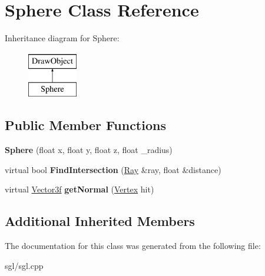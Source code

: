 \hypertarget{class_sphere}{}\section{Sphere Class Reference}
\label{class_sphere}
Inheritance diagram for Sphere\+:\begin{figure}[H]
\begin{center}
\leavevmode
\includegraphics[height=2.000000cm]{class_sphere}
\end{center}
\end{figure}
\subsection*{Public Member Functions}
\begin{DoxyCompactItemize}
\item 
\mbox{\label{class_sphere_a9a4226026f582a564c5d02939bb0f232}} 
{\bfseries Sphere} (float x, float y, float z, float \+\_\+radius)
\item 
\mbox{\label{class_sphere_acbad5180e6fd66b3f95d29cfa1139458}} 
virtual bool {\bfseries Find\+Intersection} (\hyperlink{class_ray}{Ray} \&ray, float \&distance)
\item 
\mbox{\label{class_sphere_a89d2bfb75666f496514bd35c2e23a1ce}} 
virtual \hyperlink{class_vector3f}{Vector3f} {\bfseries get\+Normal} (\hyperlink{class_vertex}{Vertex} hit)
\end{DoxyCompactItemize}
\subsection*{Additional Inherited Members}


The documentation for this class was generated from the following file\+:\begin{DoxyCompactItemize}
\item 
sgl/sgl.\+cpp\end{DoxyCompactItemize}
